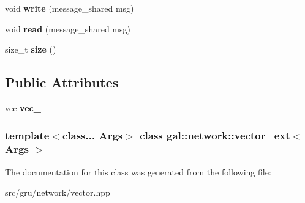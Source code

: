 \begin{DoxyCompactItemize}
\item 
\hypertarget{classgal_1_1network_1_1vector__ext_ab6231dbee5d3773f8e6c6a2099686013}{void {\bfseries write} (message\-\_\-shared msg)}\label{classgal_1_1network_1_1vector__ext_ab6231dbee5d3773f8e6c6a2099686013}

\item 
\hypertarget{classgal_1_1network_1_1vector__ext_aca9774537b3edb25bb1fbb083aba630a}{void {\bfseries read} (message\-\_\-shared msg)}\label{classgal_1_1network_1_1vector__ext_aca9774537b3edb25bb1fbb083aba630a}

\item 
\hypertarget{classgal_1_1network_1_1vector__ext_a3c2f72e7208a18ccea1aa2f0b87985e2}{size\-\_\-t {\bfseries size} ()}\label{classgal_1_1network_1_1vector__ext_a3c2f72e7208a18ccea1aa2f0b87985e2}

\end{DoxyCompactItemize}
\subsection*{\-Public \-Attributes}
\begin{DoxyCompactItemize}
\item 
\hypertarget{classgal_1_1network_1_1vector__ext_ac14af4fb2f11ce5fe177384c10ea9f31}{vec {\bfseries vec\-\_\-}}\label{classgal_1_1network_1_1vector__ext_ac14af4fb2f11ce5fe177384c10ea9f31}

\end{DoxyCompactItemize}
\subsubsection*{template$<$class... \-Args$>$ class gal\-::network\-::vector\-\_\-ext$<$ Args $>$}



\-The documentation for this class was generated from the following file\-:\begin{DoxyCompactItemize}
\item 
src/gru/network/vector.\-hpp\end{DoxyCompactItemize}
